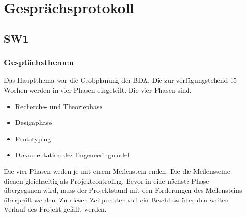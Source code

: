 
%
\chapter{Gesprächsprotokoll}
\section{SW1}
\subsection{Gesptächsthemen}
Das Hauptthema war die Grobplanung der BDA. Die zur verfügungstehend 15 Wochen werden in vier Phasen eingeteilt. Die vier Phasen sind.
\begin{itemize}
	\item Recherche- und Theoriephase
	\item Designphase
	\item Prototyping 
	\item Dokumentation des Engeneeringmodel
\end{itemize}
Die vier Phasen weden je mit einem Meilenstein enden. Die  die Meilensteine dienen gleichzeitig als Projektcontroling. Bevor in eine nächste Phase übergeganen wird, muss der Projektstand mit den Forderungen des Meilensteins überprüft werden. Zu diesen Zeitpunkten soll  ein Beschluss über den weiten Verlauf des Projekt gefällt werden.
